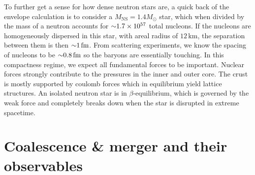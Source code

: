 To further get a sense for how dense neutron stars are, a quick back of the envelope calculation is to consider a $M_\textrm{NS} = 1.4 M _\odot$ star, which when divided by the mass of a neutron accounts for $\mathord{\sim} 1.7 \times 10^{57}$ total nucleons.
If the nucleons are homogeneously dispersed in this star, with areal radius of $12\,\textrm{km}$, the separation between them is then $\mathord{\sim} 1\,\textrm{fm}$.
From scattering experiments, we know the spacing of nucleons to be $\mathord{\sim} 0.8\,\textrm{fm}$ so the baryons are essentially touching.
In this compactness regime, we expect all fundamental forces to be important.
Nuclear forces strongly contribute to the pressures in the inner and outer core.
The crust is mostly supported by coulomb forces which in equilibrium yield lattice structures.
An isolated neutron star is in $\beta$-equilibrium, which is governed by the weak force and completely breaks down when the star is disrupted in extreme spacetime.

%
%
%
%
%
%

\section{Coalescence \& merger and their observables}
\label{sec:observables}

